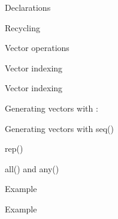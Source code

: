 \documentclass[xcolor=x11names]{beamer}
\renewcommand{\(}{\begin{columns}}
\renewcommand{\)}{\end{columns}}
\newcommand{\<}[1]{\begin{column}{#1}}
\renewcommand{\>}{\end{column}}
\begin{document}
\begin{frame}[fragile]{Declarations}
	
\end{frame}


\begin{frame}{Recycling}
	
	
\end{frame}

\begin{frame}[fragile]{Vector operations}
	
\end{frame}

\begin{frame}{Vector indexing}
	
\end{frame}
\begin{frame}{Vector indexing}
	
\end{frame}

\begin{frame}{Generating vectors with :}
	
\end{frame}

\begin{frame}{Generating vectors with seq()}
	
\end{frame}

\begin{frame}{rep()}
	
\end{frame}

\begin{frame}{all() and any()}

\end{frame}

\begin{frame}{Example}
	
\end{frame}

\begin{frame}{Example}
	
\end{frame}
\end{document}
